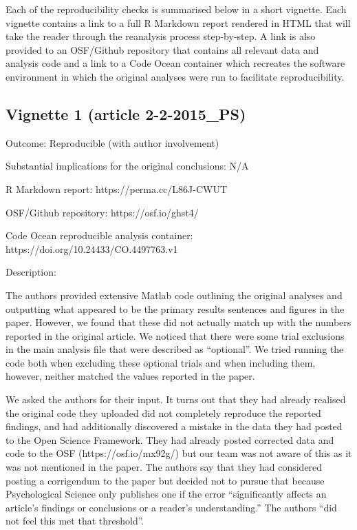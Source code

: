 \documentclass[english,,man,floatsintext]{apa6}
\begin{document}
\begin{appendix}
Each of the reproducibility checks is summarised below in a short
vignette. Each vignette contains a link to a full R Markdown report
rendered in HTML that will take the reader through the reanalysis
process step-by-step. A link is also provided to an OSF/Github
repository that contains all relevant data and analysis code and a link
to a Code Ocean container which recreates the software environment in
which the original analyses were run to facilitate reproducibility.

\hypertarget{vignette-1-article-2-2-2015_ps}{%
\subsection{Vignette 1 (article
2-2-2015\_PS)}\label{vignette-1-article-2-2-2015_ps}}

Outcome: Reproducible (with author involvement)

Substantial implications for the original conclusions: N/A

R Markdown report: https://perma.cc/L86J-CWUT

OSF/Github repository: https://osf.io/ghst4/

Code Ocean reproducible analysis container:
https://doi.org/10.24433/CO.4497763.v1

Description:

The authors provided extensive Matlab code outlining the original
analyses and outputting what appeared to be the primary results
sentences and figures in the paper. However, we found that these did not
actually match up with the numbers reported in the original article. We
noticed that there were some trial exclusions in the main analysis file
that were described as ``optional''. We tried running the code both when
excluding these optional trials and when including them, however,
neither matched the values reported in the paper.

We asked the authors for their input. It turns out that they had already
realised the original code they uploaded did not completely reproduce
the reported findings, and had additionally discovered a mistake in the
data they had posted to the Open Science Framework. They had already
posted corrected data and code to the OSF (https://osf.io/mx92g/) but
our team was not aware of this as it was not mentioned in the paper. The
authors say that they had considered posting a corrigendum to the paper
but decided not to pursue that because Psychological Science only
publishes one if the error ``significantly affects an article's findings
or conclusions or a reader's understanding.'' The authors ``did not feel
this met that threshold''.


\end{appendix}
\end{document}
